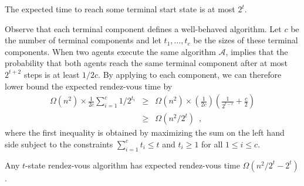 \documentclass[lotsofwhite]{patmorin}
\begin{document}
\begin{lem}
The expected time to reach some terminal start state is at most $2^t$.
\end{lem}

Observe that each terminal component defines a well-behaved algorithm.
Let $c$ be the number of terminal components and let $t_1,\ldots,t_c$ be
the sizes of these terminal components.  When two agents execute the same
algorithm $\mathcal{A}$,  implies that the probability
that both agents reach the same terminal component after at most $2^{t+2}$
steps is at least $1/2c$.  By applying  to each component, we can therefore lower bound the expected rendez-vous time by
\begin{eqnarray*}
  \Omega(n^2)\times \frac{1}{2c}\sum_{i=1}^c 1/2^{t_i} 
    & \ge & \Omega(n^2)\times \left(\frac{1}{2c}\right)\left(\frac{1}{2^{t-c}}+\frac{c}{2}\right) \\
    & \ge & \Omega(n^2/2^t) \enspace ,
\end{eqnarray*}
where the first inequality is obtained by maximizing the sum on the
left hand side subject to the constraints $\sum_{i=1}^c t_i \le t$
and $t_i \ge 1$ for all $1\le i\le c$.

\begin{thm}
Any $t$-state rendez-vous algorithm has expected rendez-vous time
$\Omega(n^2/2^t-2^t)$.
\end{thm}
\end{document}
